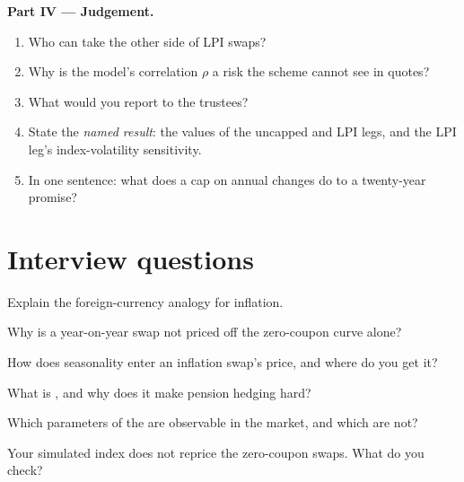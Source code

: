 \begin{problem}
\medskip\noindent\textbf{Part IV --- Judgement.}
\begin{enumerate}[resume]
\item Who can take the other side of LPI swaps?
\item Why is the model's correlation $\rho$ a risk the scheme cannot see in quotes?
\item What would you report to the trustees?
\item State the \emph{named result}: the values of the uncapped and LPI legs, and the
LPI leg's index-volatility sensitivity.
\item In one sentence: what does a cap on annual changes do to a twenty-year promise?
\end{enumerate}
\end{problem}

\section{Interview questions}

\begin{interviewq}\label{iq:rc:inflation-derivatives:1}
Explain the foreign-currency analogy for inflation.
\end{interviewq}

\begin{interviewq}\label{iq:rc:inflation-derivatives:2}
Why is a year-on-year swap not priced off the zero-coupon curve alone?
\end{interviewq}

\begin{interviewq}\label{iq:rc:inflation-derivatives:3}
How does seasonality enter an inflation swap's price, and where do you get it?
\end{interviewq}

\begin{interviewq}\label{iq:rc:inflation-derivatives:4}
What is , and why does it make pension hedging hard?
\end{interviewq}

\begin{interviewq}\label{iq:rc:inflation-derivatives:5}
Which parameters of the  are observable in the market, and which
are not?
\end{interviewq}

\begin{interviewq}\label{iq:rc:inflation-derivatives:6}
Your simulated index does not reprice the zero-coupon swaps. What do you check?
\end{interviewq}
